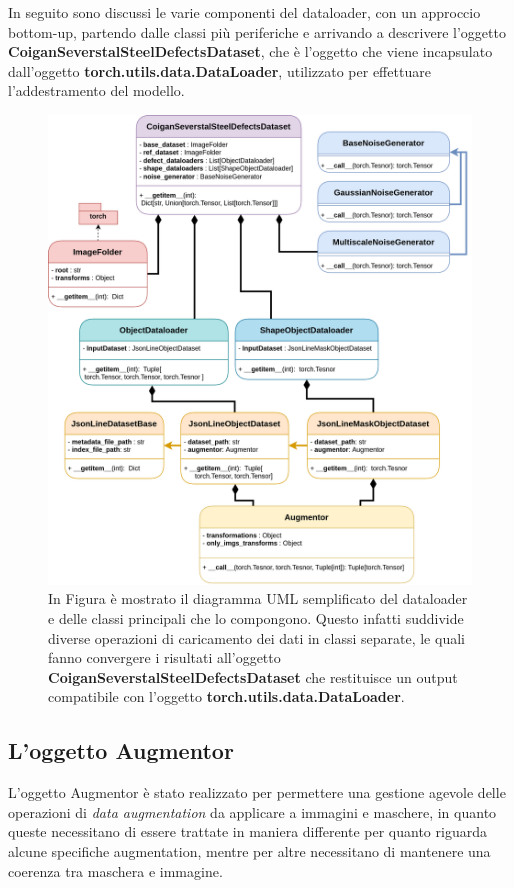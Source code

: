 In seguito sono discussi le varie componenti del dataloader, con un approccio bottom-up, partendo dalle classi più periferiche e arrivando a descrivere
l'oggetto \textbf{CoiganSeverstalSteelDefectsDataset}, che è l'oggetto che viene incapsulato dall'oggetto \textbf{torch.utils.data.DataLoader}, utilizzato
per effettuare l'addestramento del modello.

\begin{figure}
    \centering
    \includegraphics[width=1.0\textwidth]{imgs/Coigan/Dataloader uml.png}
    \caption{In Figura è mostrato il diagramma UML semplificato del dataloader e delle classi principali che lo compongono.
        Questo infatti suddivide diverse operazioni di caricamento dei dati in classi separate, le quali fanno convergere i risultati
        all'oggetto \textbf{CoiganSeverstalSteelDefectsDataset} che restituisce un output compatibile con l'oggetto \textbf{torch.utils.data.DataLoader}.}
    \label{fig:dataloader}
\end{figure}



\subsection{L'oggetto Augmentor}
L'oggetto Augmentor è stato realizzato per permettere una gestione agevole delle operazioni di \textit{data augmentation} da applicare a
immagini e maschere, in quanto queste necessitano di essere trattate in maniera differente per quanto riguarda alcune specifiche augmentation,
mentre per altre necessitano di mantenere una coerenza tra maschera e immagine.\\

